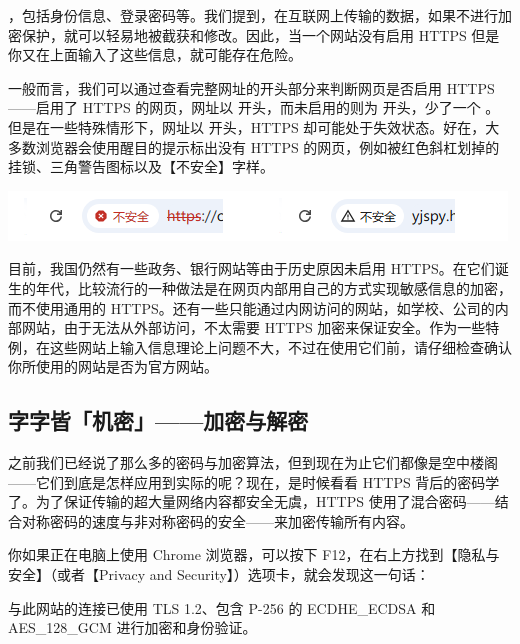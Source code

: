 \begin{warning}
  ，包括身份信息、登录密码等。我们提到，在互联网上传输的数据，如果不进行加密保护，就可以轻易地被截获和修改。因此，当一个网站没有启用 HTTPS 但是你又在上面输入了这些信息，就可能存在危险。

  一般而言，我们可以通过查看完整网址的开头部分来判断网页是否启用 HTTPS——启用了 HTTPS 的网页，网址以  开头，而未启用的则为  开头，少了一个 。但是在一些特殊情形下，网址以  开头，HTTPS 却可能处于失效状态。好在，大多数浏览器会使用醒目的提示标出没有 HTTPS 的网页，例如被红色斜杠划掉的挂锁、三角警告图标以及【不安全】字样。

  \begin{center}
    \includegraphics[width=.65\textwidth]{assets/surpass/Non-https.png}
    \label{fig:Non-https}
  \end{center}

  目前，我国仍然有一些政务、银行网站等由于历史原因未启用 HTTPS。在它们诞生的年代，比较流行的一种做法是在网页内部用自己的方式实现敏感信息的加密，而不使用通用的 HTTPS。还有一些只能通过内网访问的网站，如学校、公司的内部网站，由于无法从外部访问，不太需要 HTTPS 加密来保证安全。作为一些特例，在这些网站上输入信息理论上问题不大，不过在使用它们前，请仔细检查确认你所使用的网站是否为官方网站。
\end{warning}

\subsection{字字皆「机密」——加密与解密}

之前我们已经说了那么多的密码与加密算法，但到现在为止它们都像是空中楼阁——它们到底是怎样应用到实际的呢？现在，是时候看看 HTTPS 背后的密码学了。为了保证传输的超大量网络内容都安全无虞，HTTPS 使用了混合密码——结合对称密码的速度与非对称密码的安全——来加密传输所有内容。

你如果正在电脑上使用 Chrome 浏览器，可以按下 F12，在右上方找到【隐私与安全】（或者【Privacy and Security】）选项卡，就会发现这一句话：

\begin{quoting}
  与此网站的连接已使用 TLS 1.2、包含 P-256 的 ECDHE\_{}ECDSA 和 AES\_{}128\_{}GCM 进行加密和身份验证。
\end{quoting}

